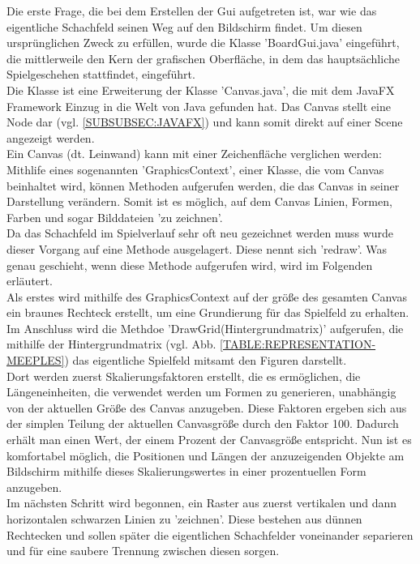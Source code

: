 \documentclass[12pt,a4paper]{article}
\begin{document}
Die erste Frage, die bei dem Erstellen der Gui aufgetreten ist, war wie das eigentliche Schachfeld seinen Weg auf den Bildschirm findet. 
Um diesen ursprünglichen Zweck zu erfüllen, wurde die Klasse 'BoardGui.java' eingeführt, die mittlerweile den Kern der grafischen Oberfläche, in dem das hauptsächliche Spielgeschehen stattfindet, eingeführt. \\
Die Klasse ist eine Erweiterung der Klasse 'Canvas.java', die mit dem JavaFX Framework Einzug in die Welt von Java gefunden hat. Das Canvas stellt eine Node dar (vgl.  \ref{SUBSUBSEC:JAVAFX}) und kann somit direkt auf einer Scene angezeigt werden.\\
Ein Canvas (dt. Leinwand) kann mit einer Zeichenfläche verglichen werden: Mithlife eines sogenannten 'GraphicsContext', einer Klasse, die vom Canvas beinhaltet wird, können Methoden aufgerufen werden, die das Canvas in seiner Darstellung verändern. Somit ist es möglich, auf dem Canvas Linien, Formen, Farben und sogar Bilddateien 'zu zeichnen'. \\
Da das Schachfeld im Spielverlauf sehr oft neu gezeichnet werden muss wurde dieser Vorgang auf eine Methode ausgelagert. Diese nennt sich 'redraw'. Was genau geschieht, wenn diese Methode aufgerufen wird, wird im Folgenden erläutert. \\[2ex]
Als erstes wird mithilfe des GraphicsContext auf der größe des gesamten Canvas ein braunes Rechteck erstellt, um eine Grundierung für das Spielfeld zu erhalten. 
Im Anschluss wird die Methdoe 'DrawGrid(Hintergrundmatrix)' aufgerufen, die mithilfe der Hintergrundmatrix (vgl. Abb. \ref{TABLE:REPRESENTATION-MEEPLES}) das eigentliche Spielfeld mitsamt den Figuren darstellt.\\ 
Dort werden zuerst Skalierungsfaktoren erstellt, die es ermöglichen, die Längeneinheiten, die verwendet werden um Formen zu generieren, unabhängig von der aktuellen Größe des Canvas anzugeben. Diese Faktoren ergeben sich aus der simplen Teilung der aktuellen Canvasgröße durch den Faktor 100. Dadurch erhält man einen Wert, der einem Prozent der Canvasgröße entspricht. Nun ist es komfortabel möglich, die Positionen und Längen der anzuzeigenden Objekte am Bildschirm mithilfe dieses Skalierungswertes in einer prozentuellen Form anzugeben.\\
Im nächsten Schritt wird begonnen, ein Raster aus zuerst vertikalen und dann horizontalen schwarzen Linien zu 'zeichnen'. Diese bestehen aus dünnen Rechtecken und sollen später die eigentlichen Schachfelder voneinander separieren und für eine saubere Trennung zwischen diesen sorgen.\\
\end{document}

